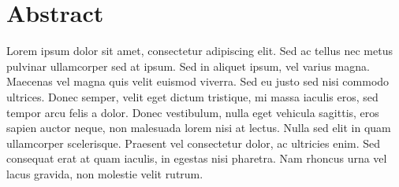 \section*{Abstract}
Lorem ipsum dolor sit amet, consectetur adipiscing elit. Sed ac tellus nec metus pulvinar ullamcorper sed at ipsum. Sed in aliquet ipsum, vel varius magna. Maecenas vel magna quis velit euismod viverra. Sed eu justo sed nisi commodo ultrices. Donec semper, velit eget dictum tristique, mi massa iaculis eros, sed tempor arcu felis a dolor. Donec vestibulum, nulla eget vehicula sagittis, eros sapien auctor neque, non malesuada lorem nisi at lectus. Nulla sed elit in quam ullamcorper scelerisque. Praesent vel consectetur dolor, ac ultricies enim. Sed consequat erat at quam iaculis, in egestas nisi pharetra. Nam rhoncus urna vel lacus gravida, non molestie velit rutrum.

